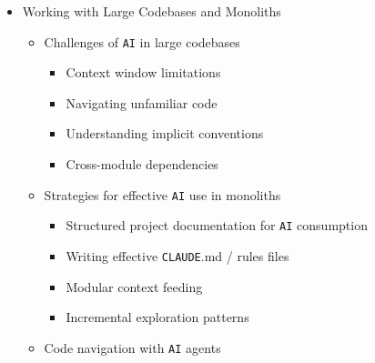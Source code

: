 \documentclass[
]{article}
\providecommand{\tightlist}{%
  \setlength{\itemsep}{0pt}\setlength{\parskip}{0pt}}
\begin{document}
\begin{itemize}
\begin{itemize}
    \begin{itemize}
    \tightlist
    \item
      \texttt{File} reading and editing
    \item
      Running shell commands
    \item
      Searching codebases
    \item
      Running tests and interpreting results
    \item
      \texttt{Git} operations
    \item
      Multi-step task execution
    \end{itemize}
  \item
    Working with agent permissions and safety models
  \item
    Configuring agents for your project (.\texttt{claude}/,
    \texttt{CLAUDE}.md, rules files)
  \item
    Giving agents project context and conventions
  \item
    Comparing agent effectiveness across tasks
  \end{itemize}
\item
  Working with Large Codebases and Monoliths

  \begin{itemize}
  \tightlist
  \item
    Challenges of \texttt{AI} in large codebases

    \begin{itemize}
    \tightlist
    \item
      Context window limitations
    \item
      Navigating unfamiliar code
    \item
      Understanding implicit conventions
    \item
      Cross-module dependencies
    \end{itemize}
  \item
    Strategies for effective \texttt{AI} use in monoliths

    \begin{itemize}
    \tightlist
    \item
      Structured project documentation for \texttt{AI} consumption
    \item
      Writing effective \texttt{CLAUDE}.md / rules files
    \item
      Modular context feeding
    \item
      Incremental exploration patterns
    \end{itemize}
  \item
    Code navigation with \texttt{AI} agents


\end{itemize}
\end{itemize}
\end{document}
